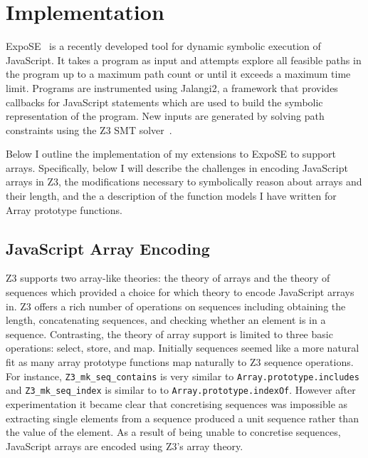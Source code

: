 \documentclass[]{final_report}
\begin{document}
\chapter{Implementation} \label{sec:implementation}

ExpoSE~\cite{Loring_2017} is a recently developed tool for dynamic symbolic execution of JavaScript. It takes a program as input and attempts explore all feasible paths in the program up to a maximum path count or until it exceeds a maximum time limit. Programs are instrumented using Jalangi2, a framework that provides callbacks for JavaScript statements which are used to build the symbolic representation of the program. New inputs are generated by solving path constraints using the Z3 SMT solver~\cite{de2008z3}.

Below I outline the implementation of my extensions to ExpoSE to support arrays. Specifically, below I will describe the challenges in encoding JavaScript arrays in Z3, the modifications necessary to symbolically reason about arrays and their length, and the a description of the function models I have written for Array prototype functions.

\section{JavaScript Array Encoding}
Z3 supports two array-like theories: the theory of arrays and the theory of sequences which provided a choice for which theory to encode JavaScript arrays in. Z3 offers a rich number of operations on sequences including obtaining the length, concatenating sequences, and checking whether an element is in a sequence. Contrasting, the theory of array support is limited to three basic operations: select, store, and map. Initially sequences seemed like a more natural fit as many array prototype functions map naturally to Z3 sequence operations. For instance, \lstinline{Z3_mk_seq_contains} is very similar to \lstinline{Array.prototype.includes} and \lstinline{Z3_mk_seq_index} is similar to to \lstinline{Array.prototype.indexOf}. However after experimentation it became clear that concretising sequences was impossible as extracting single elements from a sequence produced a unit sequence rather than the value of the element. As a result of being unable to concretise sequences, JavaScript arrays are encoded using Z3’s array theory. 
\end{document}
